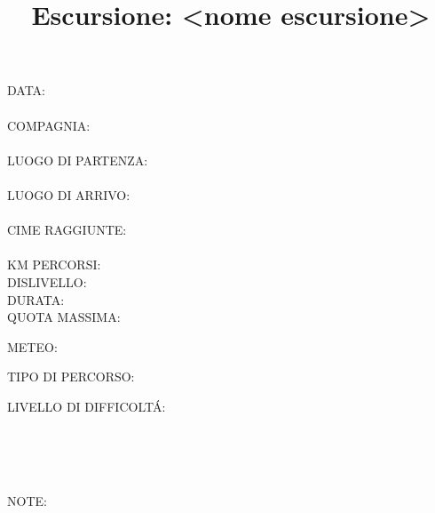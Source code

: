 \documentclass{article}
\title{\Huge Escursione: <nome escursione>}
\date{}
\author{}
\begin{document}

\maketitle

\begin{minipage}[t]{0.5\textwidth}
    \faCalendar* DATA:\\
    \\
    \faSmile[regular] COMPAGNIA:\\
    \\
    \faMapPin[regular] LUOGO DI PARTENZA:\\
    \\
    \faMapPin[regular] LUOGO DI ARRIVO:\\
    \\
    \faMountain[regular] CIME RAGGIUNTE:\\
    \vspace*{1cm}\\
    KM PERCORSI:\\
    DISLIVELLO:\\
    DURATA:\\
    QUOTA MASSIMA:\\
\end{minipage} 
\begin{minipage}[t]{0.4\textwidth}
    METEO:
    
    TIPO DI PERCORSO:
       
    LIVELLO DI DIFFICOLT\'A:
    
\end{minipage}
\centering
\raisebox{-7ex}
{
\begin{minipage}[H]{0.5\textwidth} %
    \\ %
    \\
\end{minipage}
}
\vspace*{1cm}\\

\vspace*{1cm}
NOTE: 
\end{document}
